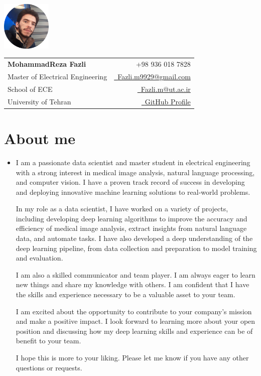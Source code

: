 \documentclass[a4paper,11pt]{article}
\makeatletter
\newcommand{\name}{MohammadReza Fazli} %
\newcommand{\course}{Master of Electrical Engineering} %
\newcommand{\phone}{936 018 7828} %
\newcommand{\emaila}{Fazli.m9929@gmail.com} %
\newcommand{\emailb}{Fazli.m@ut.ac.ir} %
\makeatother
\begin{document}
\selectfont


\parbox{2.6cm}{%
\includegraphics[width=2.35cm,clip]{my_pic.png}
}
\parbox{\dimexpr\linewidth-2.9cm\relax}{
\begin{tabularx}{\linewidth}{L r} \\
  \textbf{\Large \name} & {\raisebox{0.0\height}{\footnotesize \faPhone}\ +98 \phone}\\
  \course & \href{mailto:\emaila}{\raisebox{0.0\height}{\footnotesize \faEnvelope}\ {\emaila}} \\
  {School of ECE} &  \href{mailto:\emailb}{\raisebox{0.0\height}{\footnotesize \faEnvelope}\ {\emailb}}\\
  {University of Tehran} &  \href{https://github.com/Mohammad9929/}{\raisebox{0.0\height}{\footnotesize \faGithub}\ {GitHub Profile}} \\
\end{tabularx}
}


\section{\textbf{About me}}
  \justifying
  \begin{itemize}[leftmargin=0.1in, label={}]
    \item{
      I am a passionate data scientist and master student in electrical engineering with a strong interest in medical image analysis, natural language processing, and computer vision.
      I have a proven track record of success in developing and deploying innovative machine learning solutions to real-world problems.

      In my role as a data scientist, I have worked on a variety of projects, including developing deep learning algorithms to improve the accuracy and efficiency of medical image analysis, extract insights from natural language data, and automate tasks.
      I have also developed a deep understanding of the deep learning pipeline, from data collection and preparation to model training and evaluation.

      I am also a skilled communicator and team player.
      I am always eager to learn new things and share my knowledge with others.
      I am confident that I have the skills and experience necessary to be a valuable asset to your team.

      I am excited about the opportunity to contribute to your company's mission and make a positive impact.
      I look forward to learning more about your open position and discussing how my deep learning skills and experience can be of benefit to your team.

      I hope this is more to your liking. Please let me know if you have any other questions or requests.
    }
 \end{itemize}
 \vspace{-16pt}
\end{document}
